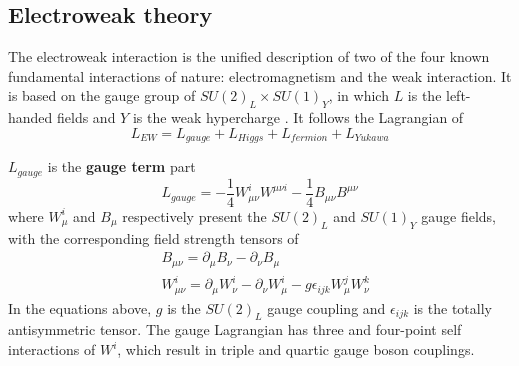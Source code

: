 \subsection{Electroweak theory}
\label{ewktheory}
The electroweak interaction is the unified description of two of the four known fundamental interactions of nature: electromagnetism and the weak interaction.
It is based on the gauge group of $SU(2)_{L} \times SU(1)_{Y}$, in which $L$ is the left-handed fields and $Y$ is the weak hypercharge \cite{Langacker:2009my}.
It follows the Lagrangian of
\begin{equation} \label{eq:Lew}
	L_{EW} = L_{gauge} + L_{Higgs} + L_{fermion} + L_{Yukawa}
\end{equation}

$L_{gauge}$ is the \textbf{gauge term} part
\begin{equation}
	L_{gauge} = -\frac{1}{4} W^{i}_{\mu\nu} W^{\mu\nu i} - \frac{1}{4} B_{\mu\nu} B^{\mu\nu}
\end{equation}
where $W^{i}_{\mu}$ and $B_{\mu}$ respectively present the $SU(2)_{L}$ and $SU(1)_{Y}$ gauge fields, with the corresponding field strength tensors of
\begin{equation}
\begin{split}
	& B_{\mu\nu} = \partial_{\mu} B_{\nu} - \partial_{\nu} B_{\mu} \\
	& W^{i}_{\mu\nu} = \partial_{\mu} W^{i}_{\nu} - \partial_{\nu} W^{i}_{\mu} - g \epsilon_{ijk} W^{j}_{\mu} W^{k}_{\nu}
\end{split}
\end{equation}
In the equations above, $g$ is the $SU(2)_{L}$ gauge coupling and $\epsilon_{ijk}$ is the totally antisymmetric tensor.
The gauge Lagrangian has three and four-point self interactions of $W^{i}$, which result in triple and quartic gauge boson couplings.

